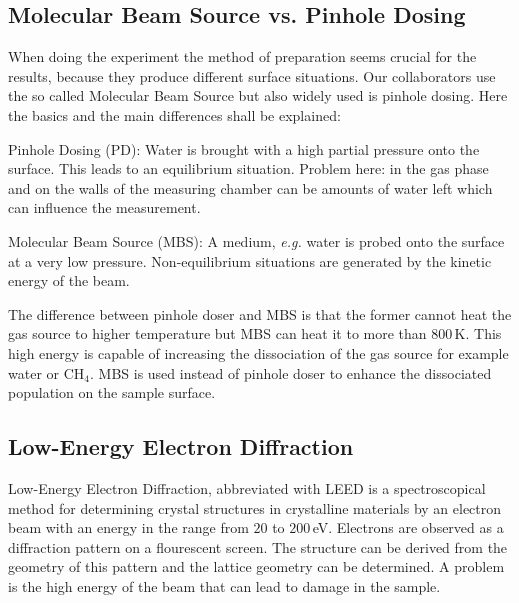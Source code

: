 \documentclass[11pt,DIV=13,BCOR=5mm,a4paper,headinclude]{scrbook}
\newcommand\todo[1]{\textcolor{red}{TODO: \textit{{#1}}}}
\begin{document}
\subsection{Molecular Beam Source vs. Pinhole Dosing}\label{mbs_vs_pd}
When doing the experiment the method of preparation seems crucial for the results, because they produce different surface situations.
Our collaborators use the so called Molecular Beam Source but also widely used is pinhole dosing.
Here the basics and the main differences shall be explained:


Pinhole Dosing (PD): Water is brought with a high partial pressure onto the surface.
This leads to an equilibrium situation.
Problem here: in the gas phase and on the walls of the measuring chamber can be amounts of water left which can influence the measurement.


Molecular Beam Source (MBS): A medium, \textit{e.g.} water is probed onto the surface at a very low pressure.
Non-equilibrium situations are generated by the kinetic energy of the beam.


The difference between pinhole doser and MBS is that the former cannot heat the gas source to higher temperature but MBS can heat it to more than $800\,$K.
This high energy is capable of increasing the dissociation of the gas source for example water or CH$_4$.
MBS is used instead of pinhole doser to enhance the dissociated population on the sample surface.

\subsection{Low-Energy Electron Diffraction}
Low-Energy Electron Diffraction, abbreviated with LEED is a spectroscopical method for determining crystal structures in crystalline materials by an electron beam with an energy in the range from $20$ to $200\,$eV.
Electrons are observed as a diffraction pattern on a flourescent screen.
The structure can be derived from the geometry of this pattern and the lattice geometry can be determined.
A problem is the high energy of the beam that can lead to damage in the sample.
\def\thefigure{B.\arabic{figure}}
\def\thetable{B.\arabic{table}}
\end{document}
